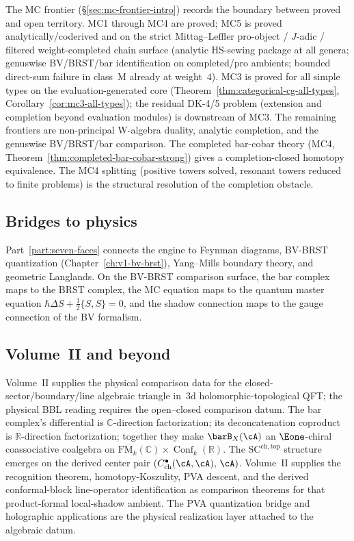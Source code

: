 The MC frontier (\S\ref{sec:mc-frontier-intro}) records the boundary
between proved and open territory. MC1 through MC4 are proved; MC5
is proved analytically/coderived and on the strict Mittag--Leffler
pro-object / $J$-adic / filtered weight-completed chain surface
\textup{(}analytic HS-sewing package at all genera; genuswise
BV/BRST/bar identification on completed/pro ambients; bounded
direct-sum failure in class~M already at weight~$4$\textup{)}.
MC3 is proved for all simple types on the evaluation-generated core
(Theorem~\ref{thm:categorical-cg-all-types},
Corollary~\ref{cor:mc3-all-types}); the residual DK-4/5 problem
(extension and completion beyond evaluation modules) is downstream
of MC3. The remaining
frontiers are non-principal W-algebra duality, analytic completion, and the
genuswise BV/BRST/bar comparison. The completed bar-cobar
theory (MC4, Theorem~\ref{thm:completed-bar-cobar-strong}) gives a
completion-closed homotopy equivalence. The MC4 splitting (positive
towers solved, resonant towers reduced to finite problems) is the
structural resolution of the completion obstacle.

\subsection{Bridges to physics}
\label{subsec:thqg-intro-guide-bridges}

Part~\ref{part:seven-faces} connects the engine to Feynman diagrams,
BV-BRST quantization (Chapter~\ref{ch:v1-bv-brst}), Yang--Mills
boundary theory, and geometric Langlands. On the BV-BRST comparison
surface, the bar complex maps to the BRST complex, the MC equation maps
to the quantum master equation
$\hbar\Delta S + \frac{1}{2}\{S,S\} = 0$, and the shadow connection
maps to the gauge connection of the BV formalism.

\subsection{Volume~II and beyond}
\label{subsec:thqg-intro-guide-vol2}

Volume~II supplies the physical comparison data for the
closed-sector/boundary/line algebraic triangle in~$3$d
holomorphic-topological QFT\@; the physical BBL reading requires the
open--closed comparison datum. The
bar complex's differential is $\mathbb{C}$-direction factorization;
its deconcatenation coproduct is $\mathbb{R}$-direction
factorization; together they make $\barB_X(\cA)$ an $\Eone$-chiral
coassociative coalgebra on
$\mathrm{FM}_k(\mathbb{C}) \times \operatorname{Conf}_k(\mathbb{R})$.
The $\mathrm{SC}^{\mathrm{ch,top}}$ structure emerges on the derived
center pair $(C^\bullet_{\mathrm{ch}}(\cA,\cA),\,\cA)$. Volume~II
supplies the recognition theorem, homotopy-Koszulity, PVA descent, and
the derived conformal-block line-operator identification as comparison
theorems for that product-formal local-shadow ambient. The PVA
quantization bridge and holographic applications are the physical
realization layer attached to the algebraic datum.

